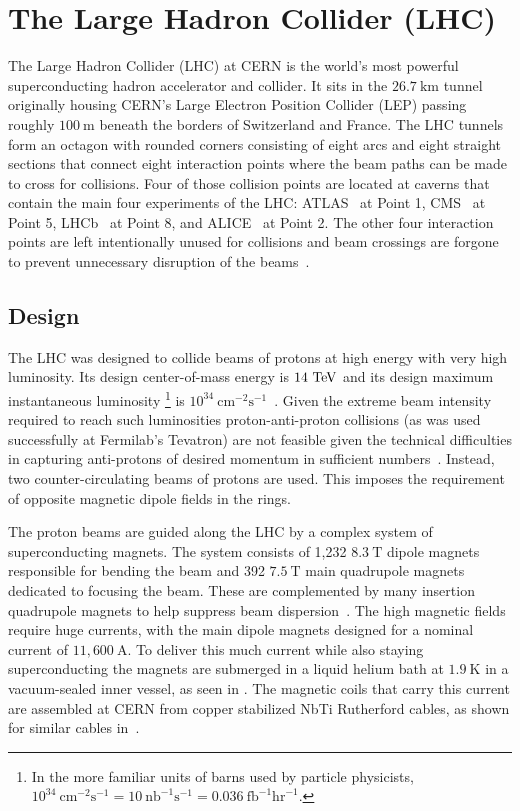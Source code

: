 \chapter{The Large Hadron Collider (LHC)}\label{chapter:LHC}

The Large Hadron Collider (\Gls{LHC}) at CERN is the world's most powerful superconducting hadron accelerator and collider.
It sits in the $26.7~\mathrm{km}$ tunnel originally housing CERN's Large Electron Position Collider (LEP) passing roughly $100~\mathrm{m}$ beneath the borders of Switzerland and France.
The LHC tunnels form an octagon with rounded corners consisting of eight arcs and eight straight sections that connect eight \glspl{interaction point} where the beam paths can be made to cross for collisions.
Four of those collision points are located at caverns that contain the main four experiments of the LHC: ATLAS~\cite{PERF-2007-01} at Point 1, CMS~\cite{CMS:2008} at Point 5, LHCb~\cite{LHCb:2008} at Point 8, and ALICE~\cite{ALICE:2008} at Point 2.
The other four interaction points are left intentionally unused for collisions and beam crossings are forgone to prevent unnecessary disruption of the beams~\cite{Evans:2008}.

\section{Design}

The LHC was designed to collide beams of protons at high energy with very high luminosity.
Its design center-of-mass energy is $14~\mathrm{TeV}{}$ and its design maximum instantaneous luminosity%
\footnote{In the more familiar units of barns used by particle physicists, $10^{34}~\mathrm{cm}^{-2}\mathrm{s}^{-1}=10~\mathrm{nb}^{-1}\mathrm{s}^{-1}=0.036~\mathrm{fb}^{-1}\mathrm{hr}^{-1}$.}
is $10^{34}~\mathrm{cm}^{-2}\mathrm{s}^{-1}$~\cite{Bruning:782076,Evans:2008}.
Given the extreme beam intensity required to reach such luminosities proton-anti-proton collisions (as was used successfully at Fermilab's Tevatron) are not feasible given the technical difficulties in capturing anti-protons of desired momentum in sufficient numbers~\cite{Oliveros:2017xrw}.
Instead, two counter-circulating beams of protons are used.
This imposes the requirement of opposite magnetic dipole fields in the rings.

The proton beams are guided along the LHC by a complex system of superconducting magnets.
The system consists of 1,232 $8.3~\mathrm{T}$ dipole magnets responsible for bending the beam and 392 $7.5~\mathrm{T}$ main quadrupole magnets dedicated to focusing the beam.
These are complemented by many insertion quadrupole magnets to help suppress beam dispersion~\cite{Rossi:2003,Rossi:2004}.
The high magnetic fields require huge currents, with the main dipole magnets designed for a nominal current of $11,600~\mathrm{A}$.
To deliver this much current while also staying superconducting the magnets are submerged in a liquid helium bath at $1.9~\mathrm{K}$ in a vacuum-sealed inner vessel, as seen in .
The magnetic coils that carry this current are assembled at CERN from copper stabilized NbTi Rutherford cables, as shown for similar cables in~\cite{CERN-FOOTAGE-2016-014-001}.

